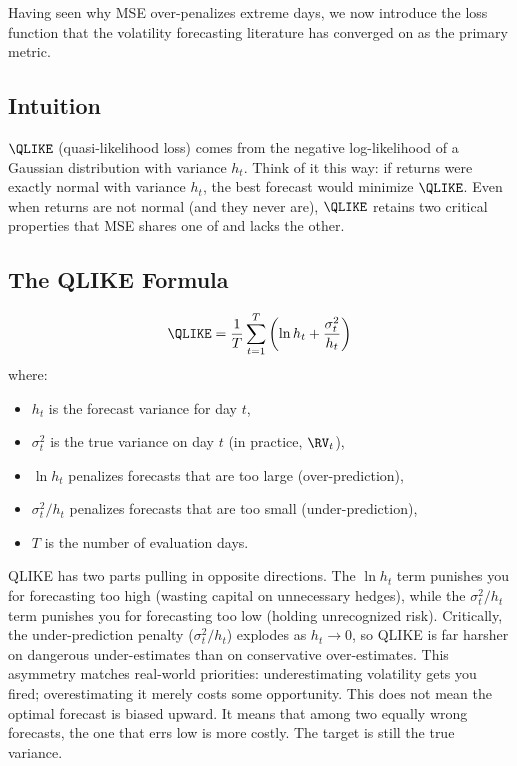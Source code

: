 Having seen why MSE over-penalizes extreme days, we now introduce the loss function that the volatility forecasting literature has converged on as the primary metric.

\subsection{Intuition}

$\QLIKE$ (quasi-likelihood loss) comes from the negative log-likelihood of a Gaussian distribution with variance $h_t$.
Think of it this way: if returns were exactly normal with variance $h_t$, the best forecast would minimize $\QLIKE$.
Even when returns are not normal (and they never are), $\QLIKE$ retains two critical properties that MSE shares one of and lacks the other.

\subsection{The QLIKE Formula}

\begin{equation}
\label{eq:qlike}
\QLIKE = \frac{1}{T}\sum_{t=1}^{T} \left(\ln h_t + \frac{\sigma^2_t}{h_t}\right)
\end{equation}
where:
\begin{itemize}[nosep]
  \item $h_t$ is the forecast variance for day $t$,
  \item $\sigma^2_t$ is the true variance on day $t$ (in practice, $\RV_t$),
  \item $\ln h_t$ penalizes forecasts that are too large (over-prediction),
  \item $\sigma^2_t / h_t$ penalizes forecasts that are too small (under-prediction),
  \item $T$ is the number of evaluation days.
\end{itemize}

\begin{intuition}
QLIKE has two parts pulling in opposite directions.
The $\ln h_t$ term punishes you for forecasting too high (wasting capital on unnecessary hedges), while the $\sigma^2_t / h_t$ term punishes you for forecasting too low (holding unrecognized risk).
Critically, the under-prediction penalty ($\sigma^2_t / h_t$) explodes as $h_t \to 0$, so QLIKE is far harsher on dangerous under-estimates than on conservative over-estimates.
This asymmetry matches real-world priorities: underestimating volatility gets you fired; overestimating it merely costs some opportunity.
This does not mean the optimal forecast is biased upward.
It means that among two equally wrong forecasts, the one that errs low is more costly.
The target is still the true variance.
\end{intuition}

